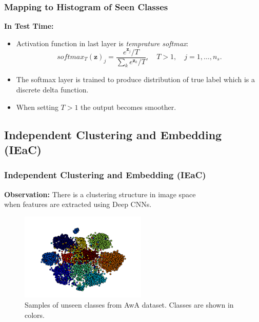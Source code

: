 \documentclass{beamer}
\begin{document}
\begin{frame}\frametitle{Mapping to Histogram of Seen Classes}
  \textbf{In Test Time:}
\begin{itemize}
  \item Activation function in last layer is \textit{temprature softmax}:
    \begin{equation}
    \label{softmax}
    softmax_T(\mathbf{z})_j = \frac{e^{\mathbf{z}_j}/T}{\sum_k e^{\mathbf{z}_k}/T}, \quad T>1,  \quad j = 1, \ldots, n_s.
    \end{equation}
\item The softmax layer is trained to produce distribution of true label which is a discrete delta function.
\item When setting $T > 1$ the output becomes smoother.
\end{itemize}
%
\begin{figure}
\hfill
{}
\hfill
{}
\hfill
\end{figure}
\end{frame}

\subsection{Independent Clustering and Embedding (IEaC)}
\label{sub:Custering and Linear Embedding}
\begin{frame}\frametitle{Independent Clustering and Embedding (IEaC)}
  \textbf{Observation:}  There is a clustering structure in image space \\
  when features are extracted using Deep CNNs.
  \begin{figure}
\includegraphics[width=6cm]{awa_clusters}
\caption{\scriptsize Samples of unseen classes from AwA dataset. Classes are shown in colors.}
  \end{figure}
\end{frame}
\end{document}

